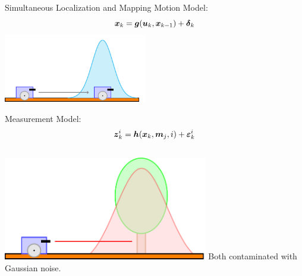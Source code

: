 \documentclass{beamer}
\begin{document}
\begin{frame}{Simultaneous Localization and Mapping}
Motion Model:
\begin{equation*}
\boldsymbol{x}_k = \boldsymbol{g}(\boldsymbol{u}_k, \boldsymbol{x}_{k-1}) + \boldsymbol{\delta}_k
\label{eq:motion-model}
\end{equation*}  
\centering
\includegraphics[width=0.47\textwidth]{tikz/motion.pdf}\\
\raggedright
Measurement Model:
\begin{equation*}
\boldsymbol{z}_k^i = \boldsymbol{h}(\boldsymbol{x}_k,\boldsymbol{m}_j,i) + \boldsymbol{\varepsilon}_k^i
\label{eq:measurement-model}
\end{equation*}
\vspace{-1em}
\begin{columns}
\raggedleft
\includegraphics[width=0.67\textwidth]{tikz/measurements.pdf}
Both contaminated with Gaussian noise.
\end{columns}
\end{frame}
\end{document}
